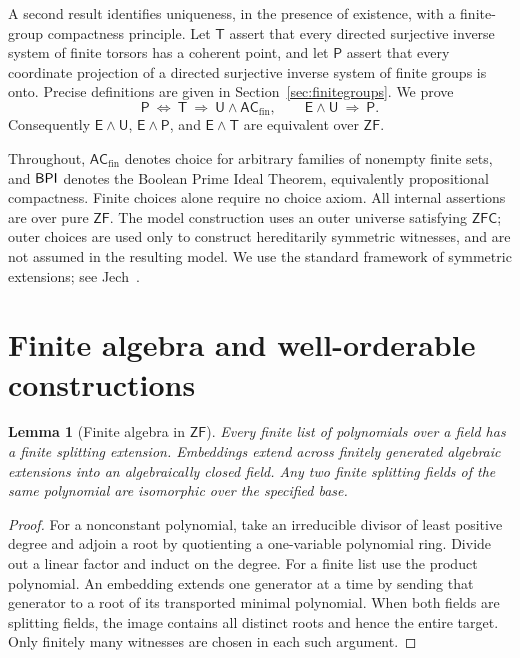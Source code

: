 \documentclass[11pt,a4paper]{article}
\newtheorem{lemma}[theorem]{Lemma}
\theoremstyle{definition}\newtheorem{definition}[theorem]{Definition}
\theoremstyle{remark}\newtheorem{remark}[theorem]{Remark}
\newcommand{\ZF}{\mathsf{ZF}}\newcommand{\ZFA}{\mathsf{ZFA}}
\newcommand{\E}{\mathsf E}\newcommand{\U}{\mathsf U}
\newcommand{\ACfin}{\mathsf{AC}_{\mathrm{fin}}}
\begin{document}
A second result identifies uniqueness, in the presence of existence, with a finite-group compactness principle. Let $\mathsf T$ assert that every directed surjective inverse system of finite torsors has a coherent point, and let $\mathsf P$ assert that every coordinate projection of a directed surjective inverse system of finite groups is onto. Precise definitions are given in Section~\ref{sec:finitegroups}. We prove
\[
\mathsf P\ \Longleftrightarrow\ \mathsf T\ \Longrightarrow\ \U\wedge\ACfin,
\qquad
\E\wedge\U\ \Longrightarrow\ \mathsf P.
\]
Consequently $\E\wedge\U$, $\E\wedge\mathsf P$, and $\E\wedge\mathsf T$ are equivalent over $\ZF$.

Throughout, $\ACfin$ denotes choice for arbitrary families of nonempty finite sets, and $\mathsf{BPI}$ denotes the Boolean Prime Ideal Theorem, equivalently propositional compactness. Finite choices alone require no choice axiom. All internal assertions are over pure $\ZF$. The model construction uses an outer universe satisfying $\mathsf{ZFC}$; outer choices are used only to construct hereditarily symmetric witnesses, and are not assumed in the resulting model. We use the standard framework of symmetric extensions; see Jech~\cite{Jech}.

\section{Finite algebra and well-orderable constructions}
\begin{lemma}[Finite algebra in $\ZF$]\label{lem:finite}
Every finite list of polynomials over a field has a finite splitting extension. Embeddings extend across finitely generated algebraic extensions into an algebraically closed field. Any two finite splitting fields of the same polynomial are isomorphic over the specified base.
\end{lemma}
\begin{proof}
For a nonconstant polynomial, take an irreducible divisor of least positive degree and adjoin a root by quotienting a one-variable polynomial ring. Divide out a linear factor and induct on the degree. For a finite list use the product polynomial. An embedding extends one generator at a time by sending that generator to a root of its transported minimal polynomial. When both fields are splitting fields, the image contains all distinct roots and hence the entire target. Only finitely many witnesses are chosen in each such argument.
\end{proof}
\end{document}
